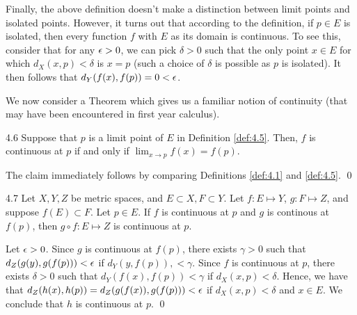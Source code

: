 Finally, the above definition doesn't make a distinction between limit points and isolated points. However, it turns out that according to the definition, if $p \in E$ is isolated, then every function $f$ with $E$ as its domain is continuous. To see this, consider that for any $\epsilon > 0$, we can pick $\delta > 0$ such that the only point $x \in E$ for which $d_X(x, p) < \delta$ is $x = p$ (such a choice of $\delta$ is possible as $p$ is isolated). It then follows that $d_Y(f(x), f(p)) = 0 < \epsilon$. 
 
We now consider a Theorem which gives us a familiar notion of continuity (that may have been encountered in first year calculus).

\begin{theorem}{}{4.6}
    Suppose that $p$ is a limit point of $E$ in Definition \ref{def:4.5}. Then, $f$ is continuous at $p$ if and only if $\lim_{x \rightarrow p}f(x) = f(p)$. 
\end{theorem}
\begin{nproof}
    The claim immediately follows by comparing Definitions \ref{def:4.1} and \ref{def:4.5}. \qed
\end{nproof}

\begin{theorem}{}{4.7}
    Let $X, Y, Z$ be metric spaces, and $E \subset X, F \subset Y$. Let $f: E \mapsto Y$, $g: F \mapsto Z$, and suppose $f(E) \subset F$. Let $p \in E$. If $f$ is continuous at $p$ and $g$ is continous at $f(p)$, then $g \circ f: E \mapsto Z$ is continuous at $p$.
\end{theorem}
\begin{nproof}
    Let $\epsilon > 0$. Since $g$ is continuous at $f(p)$, there exists $\gamma > 0$ such that $d_Z(g(y), g(f(p))) < \epsilon$ if $d_Y(y, f(p)) ,< \gamma$. Since $f$ is continuous at $p$, there exists $\delta > 0$ such that $d_Y(f(x), f(p)) < \gamma$ if $d_X(x, p) < \delta$. Hence, we have that $d_Z(h(x), h(p)) = d_Z(g(f(x)), g(f(p))) < \epsilon$ if $d_X(x, p) < \delta$ and $x \in E$. We conclude that $h$ is continuous at $p$. \qed
\end{nproof}

